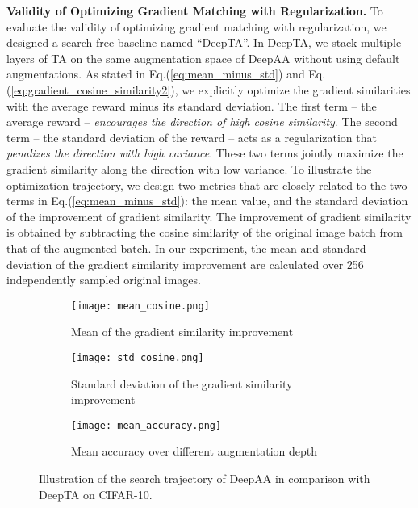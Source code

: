 \vspace{1mm}
\textbf{Validity of Optimizing Gradient Matching with Regularization.}
To evaluate the validity of optimizing gradient matching with regularization, we designed a search-free baseline named ``DeepTA''. In DeepTA, we stack multiple layers of TA on the same augmentation space of DeepAA without using default augmentations. 
As stated in Eq.(\ref{eq:mean_minus_std}) and Eq.(\ref{eq:gradient_cosine_similarity2}), we explicitly optimize the gradient similarities with the average reward minus its standard deviation. 
The first term -- the average reward  -- \emph{encourages the direction of high cosine similarity}. 
The second term -- the standard deviation of the reward  -- acts as a regularization that \emph{penalizes the direction with high variance}. These two terms jointly maximize the gradient similarity along the direction with low variance. To illustrate the optimization trajectory, we design two metrics that are closely related to the two terms in Eq.(\ref{eq:mean_minus_std}): the mean value, and the standard deviation of the improvement of gradient similarity. The improvement of gradient similarity is obtained by subtracting the cosine similarity of the original image batch from that of the augmented batch. In our experiment, the mean and standard deviation of the gradient similarity improvement are calculated over 256 independently sampled original images. 


\begin{figure}[t]
    \begin{subfigure}[b]{0.325\linewidth}
    \centering
    \texttt{[image: mean\_cosine.png]}
    \caption{Mean of the gradient similarity improvement}
    \label{fig:mean_traj}
    \end{subfigure}
    \hfill
    \begin{subfigure}[b]{0.325\linewidth}
    \centering
    \texttt{[image: std\_cosine.png]}
    \caption{Standard deviation of the gradient similarity improvement}
     \label{fig:std_traj}
    \end{subfigure}
    \hfill
    \begin{subfigure}[b]{0.325\linewidth}
    \centering
    \texttt{[image: mean\_accuracy.png]}
    \caption{Mean accuracy over different augmentation depth}
     \label{fig:acc_traj}
    \end{subfigure}
\vspace{1mm}
\caption{{\small Illustration of the search trajectory of DeepAA in comparison with DeepTA on CIFAR-10.}}\label{fig:mean_std_acc}
\vspace{-0mm}
\end{figure}


